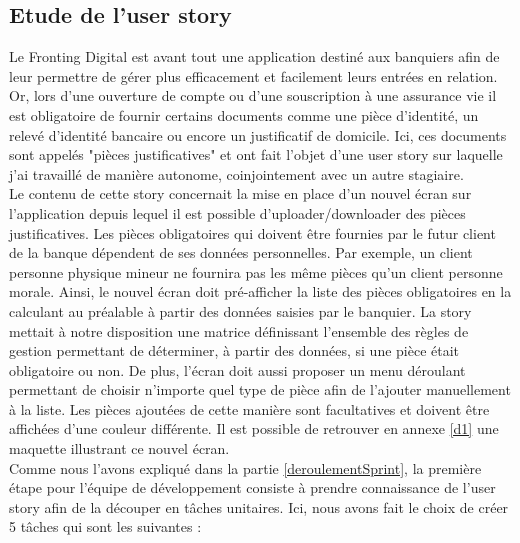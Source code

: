 \subsection{Etude de l'user story}

	Le Fronting Digital est avant tout une application destiné aux banquiers afin de leur permettre de gérer plus efficacement et facilement leurs entrées en relation. Or, lors d'une ouverture de compte ou d'une souscription à une assurance vie il est obligatoire de fournir certains documents comme une pièce d'identité, un relevé d'identité bancaire ou encore un justificatif de domicile. Ici, ces documents sont appelés "pièces justificatives" et ont fait l'objet d'une user story sur laquelle j'ai travaillé de manière autonome, coinjointement avec un autre stagiaire. \\
	
	Le contenu de cette story concernait la mise en place d'un nouvel écran sur l'application depuis lequel il est possible d'uploader/downloader des pièces justificatives. Les pièces obligatoires qui doivent être fournies par le futur client de la banque dépendent de ses données personnelles. Par exemple, un client personne physique mineur ne fournira pas les même pièces qu'un client personne morale. Ainsi, le nouvel écran doit pré-afficher la liste des pièces obligatoires en la calculant au préalable à partir des données saisies par le banquier. La story mettait à notre disposition une matrice définissant l'ensemble des règles de gestion permettant de déterminer, à partir des données, si une pièce était obligatoire ou non. De plus, l'écran doit aussi proposer un menu déroulant permettant de choisir n'importe quel type de pièce afin de l'ajouter manuellement à la liste. Les pièces ajoutées de cette manière sont facultatives et doivent être affichées d'une couleur différente. Il est possible de retrouver en annexe \ref{d1} une maquette illustrant ce nouvel écran. \\

	Comme nous l'avons expliqué dans la partie \ref{deroulementSprint}, la première étape pour l'équipe de développement consiste à prendre connaissance de l'user story afin de la découper en tâches unitaires. Ici, nous avons fait le choix de créer 5 tâches qui sont les suivantes :
	
